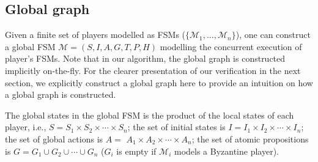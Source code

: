\subsection{Global graph}

Given a finite set of players 
modelled as FSMs ($\{\mathcal{M}_1, \ldots, \mathcal{M}_n\}$), one can construct a global
FSM $\mathcal{M}=(S, I, A, G, T, P, H)$ modelling the concurrent execution of player's FSMs.
Note that in our algorithm, the global graph is constructed implicitly on-the-fly. 
For the clearer presentation of our verification in the next section, we explicitly construct a global graph here
to provide an intuition on how a global graph is constructed.

The global states in the global FSM is the product of the local states of each player, 
i.e., $S= S_1 \times S_2 \times\cdots\times S_n$; the set of initial states is 
$I = I_1 \times I_2 \times\cdots \times I_n$; the set of global actions 
is $A=$ $A_1 \times A_2 \times \cdots\times A_n$; the set of atomic propositions
is $G= G_1\cup G_2\cup \cdots\cup G_n$ ($G_i$ is empty if $\mathcal{M}_i$ models a Byzantine player).

